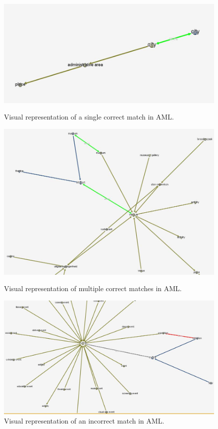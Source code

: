 \documentclass[runningheads,a4paper]{../../StyleFiles/llncs}
\begin{document}
\begin{figure}[h]\centering
	\includegraphics[width=.8\textwidth]{img/match_city.png}
	\caption{Visual representation of a single correct match in AML.}
	\label{fig:single_match}
	\includegraphics[width=.8\textwidth]{img/match_combo.png}
	\caption{Visual representation of multiple correct matches in AML.}
	\label{fig:multiple_match}
	\includegraphics[width=.8\textwidth]{img/conflict_exhibition_exposition.png}
	\caption{Visual representation of an incorrect match in AML.}
	\label{fig:incorrect_match}
\end{figure}
\end{document}
